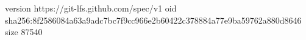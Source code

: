 version https://git-lfs.github.com/spec/v1
oid sha256:8f2586084a63a9adc7bc7f9cc966e2b60422c378884a77e9ba59762a880d8646
size 87540
